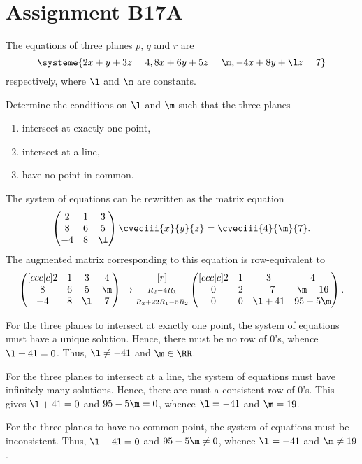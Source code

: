 \section{Assignment B17A}

\begin{problem}
    The equations of three planes $p$, $q$ and $r$ are \[\systeme{2x + y + 3z = 4, 8x + 6y + 5z = \m, -4x + 8y + \l z = 7}\] respectively, where $\l$ and $\m$ are constants.

    Determine the conditions on $\l$ and $\m$ such that the three planes
    \begin{enumerate}
        \item intersect at exactly one point,
        \item intersect at a line,
        \item have no point in common.
    \end{enumerate}
\end{problem}
\begin{solution}
    The system of equations can be rewritten as the matrix equation \[\begin{pmatrix}2 & 1 & 3 \\ 8 & 6 & 5 \\ -4 & 8 & \l\end{pmatrix} \cveciii{x}{y}{z} = \cveciii{4}{\m}{7}.\] The augmented matrix corresponding to this equation is row-equivalent to \[\begin{pmatrix}[ccc|c]2 & 1 & 3 & 4 \\ 8 & 6 & 5 & \m \\ -4 & 8 & \l & 7\end{pmatrix} \rightarrow \begin{matrix}[r] \\ \scriptstyle R_2 - 4R_1 \\ \scriptstyle R_3 + 22R_1 - 5R_2\end{matrix} \begin{pmatrix}[ccc|c] 2 & 1 & 3 & 4 \\ 0 & 2 & -7 & \m - 16 \\ 0 & 0 & \l + 41 & 95 - 5 \m\end{pmatrix}.\]

    \begin{ppart}
        For the three planes to intersect at exactly one point, the system of equations must have a unique solution. Hence, there must be no row of 0's, whence $\l + 41 = 0$. Thus, $\l \neq -41$ and $\m \in \RR$.
    \end{ppart}
    \begin{ppart}
        For the three planes to intersect at a line, the system of equations must have infinitely many solutions. Hence, there are must a consistent row of 0's. This gives $\l + 41 = 0$ and $95 - 5\m = 0$, whence $\l = -41$ and $\m = 19$.
    \end{ppart}
    \begin{ppart}
        For the three planes to have no common point, the system of equations must be inconsistent. Thus, $\l + 41 = 0$ and $95 - 5\m \neq 0$, whence $\l = -41$ and $\m \neq 19$.
    \end{ppart}
\end{solution}

